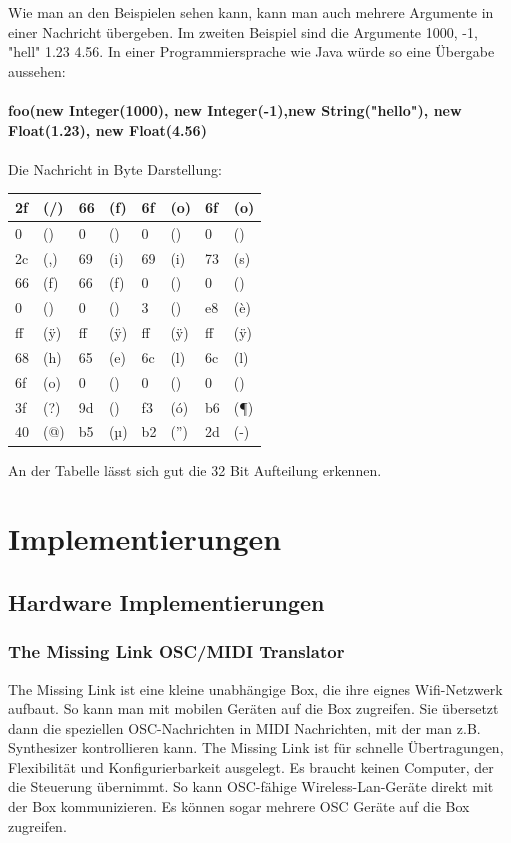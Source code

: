 \documentclass[a4paper, 12pt]{article}
\begin{document}
Wie man an den Beispielen sehen kann, kann man auch mehrere Argumente in einer Nachricht übergeben. Im zweiten Beispiel sind die Argumente 1000, -1, "hell" 1.23 4.56.
In einer Programmiersprache wie Java würde so eine Übergabe aussehen: \\
\\
{\bf foo(new Integer(1000), new Integer(-1),new String("hello"), new Float(1.23), new Float(4.56)}\\
\\
Die Nachricht in Byte Darstellung:
\begin{table}[ht]
\centering
\begin{tabular}{|p{0.5cm}|p{1.5cm}|p{0.5cm}|p{1.5cm}|p{0.5cm}|p{1.5cm}|p{0.5cm}|p{1.5cm}|}
\hline
 2f & (/) & 66 & (f) & 6f & (o) & 6f & (o)\\ \hline
 0 & () & 0 & () & 0 & () & 0 & ()\\ \hline
 2c & (,) & 69 & (i) & 69 & (i) & 73 & (s) \\ \hline
 66 & (f) & 66 & (f) & 0 & () & 0 & () \\ \hline
 0 & () & 0 & () & 3 & () & e8 & (è) \\ \hline
 ff & (ÿ) & ff & (ÿ) & ff & (ÿ) & ff & (ÿ) \\
 68 & (h) & 65 & (e) & 6c & (l) & 6c & (l) \\ \hline
 6f & (o) & 0 & () & 0 & () & 0 & () \\ \hline
 3f & (?) & 9d & () & f3 & (ó) & b6 & (¶) \\ \hline
 40 & (@) & b5 & (µ) & b2 & (”) & 2d & (-) \\ \hline
\end{tabular}
\end{table}
\newpage
An der Tabelle lässt sich gut die 32 Bit Aufteilung erkennen.

\section{Implementierungen}
\subsection{Hardware Implementierungen}
\subsubsection{The Missing Link OSC/MIDI Translator}

The Missing Link ist eine kleine unabhängige Box, die ihre eignes Wifi-Netzwerk aufbaut. So kann man mit mobilen Geräten auf die Box zugreifen. Sie übersetzt dann die speziellen OSC-Nachrichten in MIDI Nachrichten, mit der man z.B. Synthesizer kontrollieren kann. The Missing Link ist für schnelle Übertragungen, Flexibilität und Konfigurierbarkeit ausgelegt. Es braucht keinen Computer, der die Steuerung übernimmt. So kann OSC-fähige Wireless-Lan-Geräte direkt mit der Box kommunizieren. Es können sogar mehrere OSC Geräte auf die Box zugreifen.
\end{document}

